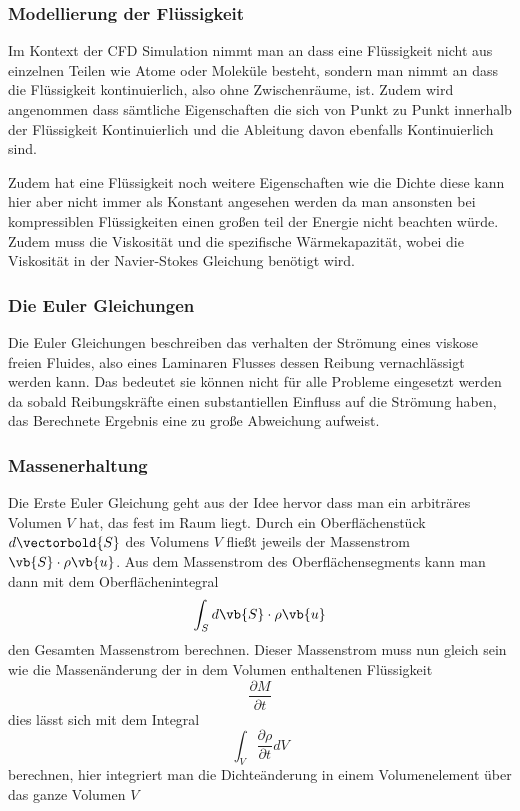 \subsubsection{Modellierung der Flüssigkeit}
Im Kontext der CFD Simulation nimmt man an dass eine Flüssigkeit nicht aus einzelnen Teilen wie Atome oder Moleküle besteht, sondern man nimmt an dass die Flüssigkeit kontinuierlich, also ohne Zwischenräume, ist. 
Zudem wird angenommen dass sämtliche Eigenschaften die sich von Punkt zu Punkt innerhalb der Flüssigkeit Kontinuierlich und die Ableitung davon ebenfalls Kontinuierlich sind. 

Zudem hat eine Flüssigkeit noch weitere Eigenschaften wie die Dichte diese kann hier aber nicht immer als Konstant angesehen werden da man ansonsten bei kompressiblen Flüssigkeiten einen großen teil der Energie nicht beachten würde.
Zudem muss die Viskosität und die spezifische Wärmekapazität, wobei die Viskosität in der Navier-Stokes Gleichung benötigt wird.

\subsubsection{Die Euler Gleichungen}
Die Euler Gleichungen beschreiben das verhalten der Strömung eines viskose freien Fluides, also eines Laminaren Flusses dessen Reibung vernachlässigt werden kann. 
Das bedeutet sie können nicht für alle Probleme eingesetzt werden da sobald Reibungskräfte einen substantiellen Einfluss auf die Strömung haben, das Berechnete Ergebnis eine zu große Abweichung aufweist.

\subsubsection{Massenerhaltung}
Die Erste Euler Gleichung geht aus der Idee hervor dass man ein arbiträres Volumen $V$ hat, das fest im Raum liegt. Durch ein Oberflächenstück 
$d \vectorbold{S} $ 
des Volumens 
$V$
 fließt jeweils der Massenstrom 
$\vb{S} \cdot\rho\vb{u}$.
Aus dem Massenstrom des Oberflächensegments kann man dann mit dem Oberflächenintegral 
\[\int_{S}d\vb{S}\cdot\rho\vb{u}\]
den Gesamten Massenstrom berechnen. Dieser Massenstrom muss nun gleich sein wie die Massenänderung der in dem Volumen enthaltenen Flüssigkeit 
\[\frac{\partial M}{\partial t}\]
dies lässt sich mit dem Integral 
\[\int_{V}\frac{\partial \rho}{\partial t} dV\]
berechnen, hier integriert man die Dichteänderung in einem Volumenelement über das ganze Volumen 
$V$ 

